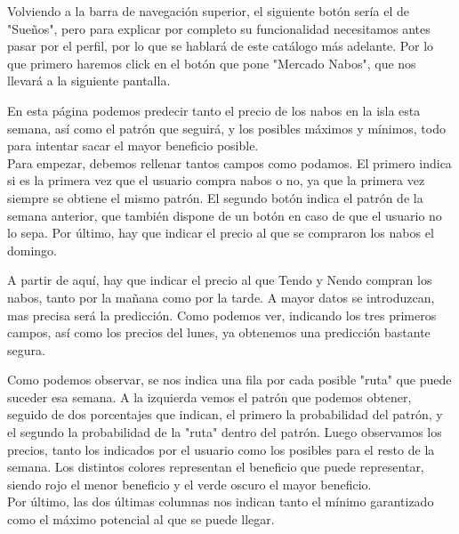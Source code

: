 Volviendo a la barra de navegación superior, el siguiente botón sería el de "Sueños", pero para explicar por completo su funcionalidad necesitamos antes pasar por el perfil, por lo que se hablará de este catálogo más adelante. Por lo que primero haremos click en el botón que pone "Mercado Nabos", que nos llevará a la siguiente pantalla.\\


En esta página podemos predecir tanto el precio de los nabos en la isla esta semana, así como el patrón que seguirá, y los posibles máximos y mínimos, todo para intentar sacar el mayor beneficio posible.\\

Para empezar, debemos rellenar tantos campos como podamos. El primero indica si es la primera vez que el usuario compra nabos o no, ya que la primera vez siempre se obtiene el mismo patrón.
El segundo botón indica el patrón de la semana anterior, que también dispone de un botón en caso de que el usuario no lo sepa. Por último, hay que indicar el precio al que se compraron los nabos el domingo.\\


A partir de aquí, hay que indicar el precio al que Tendo y Nendo compran los nabos, tanto por la mañana como por la tarde. A mayor datos se introduzcan, mas precisa será la predicción. Como podemos ver, indicando los tres primeros campos, así como los precios del lunes, ya obtenemos una predicción bastante segura.\\


Como podemos observar, se nos indica una fila por cada posible "ruta" que puede suceder esa semana. A la izquierda vemos el patrón que podemos obtener, seguido de dos porcentajes que indican, el primero la probabilidad del patrón, y el segundo la probabilidad de la "ruta" dentro del patrón. Luego observamos los precios, tanto los indicados por el usuario como los posibles para el resto de la semana. Los distintos colores representan el beneficio que puede representar, siendo rojo el menor beneficio y el verde oscuro el mayor beneficio.\\

Por último, las dos últimas columnas nos indican tanto el mínimo garantizado como el máximo potencial al que se puede llegar.\\

